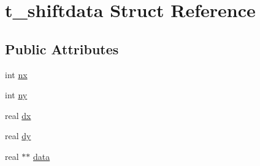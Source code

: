 \hypertarget{structt__shiftdata}{\section{t\-\_\-shiftdata \-Struct \-Reference}
\label{structt__shiftdata}
}
\subsection*{\-Public \-Attributes}
\begin{DoxyCompactItemize}
\item 
int \hyperlink{structt__shiftdata_a61abb437d4ce4b5d6e00743024866c85}{nx}
\item 
int \hyperlink{structt__shiftdata_aabc087fb53be1c60581e3bbf0bf1d74c}{ny}
\item 
real \hyperlink{structt__shiftdata_a90900e3a7042e0695426e7515e46bfbf}{dx}
\item 
real \hyperlink{structt__shiftdata_a13db98617001091323bf494fff9fb206}{dy}
\item 
real $\ast$$\ast$ \hyperlink{structt__shiftdata_a6edf915eb8eead5fcaa9b1c42195dc3a}{data}
\end{DoxyCompactItemize}


